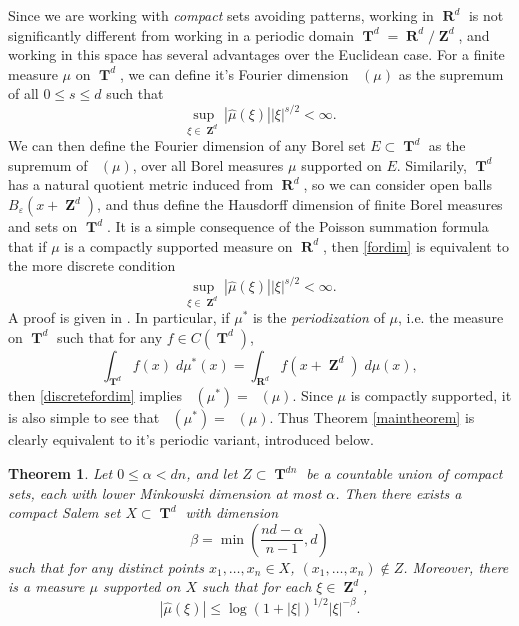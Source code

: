 \documentclass[12pt,reqno]{article}
\numberwithin{equation}{section}
\DeclareMathOperator{\hausdim}{\dim_{\mathbf{H}}}
\DeclareMathOperator{\fordim}{\dim_{\mathbf{F}}}
\DeclareMathOperator{\RR}{\mathbf{R}}
\DeclareMathOperator{\ZZ}{\mathbf{Z}}
\DeclareMathOperator{\TT}{\mathbf{T}}
\newtheorem{theorem}{Theorem}
\begin{document}
Since we are working with \emph{compact} sets avoiding patterns, working in $\RR^d$ is not significantly different from working in a periodic domain $\TT^d = \RR^d / \ZZ^d$, and working in this space has several advantages over the Euclidean case. For a finite measure $\mu$ on $\TT^d$, we can define it's Fourier dimension $\fordim(\mu)$ as the supremum of all $0 \leq s \leq d$ such that
%
\begin{equation} \label{fordimtorus}
    \sup_{\xi \in \ZZ^d} |\widehat{\mu}(\xi)| |\xi|^{s/2} < \infty.
\end{equation}
%
We can then define the Fourier dimension of any Borel set $E \subset \TT^d$ as the supremum of $\fordim(\mu)$, over all Borel measures $\mu$ supported on $E$. Similarily, $\TT^d$ has a natural quotient metric induced from $\RR^d$, so we can consider open balls $B_\varepsilon(x + \ZZ^d)$, and thus define the Hausdorff dimension of finite Borel measures and sets on $\TT^d$. It is a simple consequence of the Poisson summation formula that if $\mu$ is a compactly supported measure on $\RR^d$, then \eqref{fordim} is equivalent to the more discrete condition
%
\begin{equation} \label{discretefordim}
    \sup_{\xi \in \ZZ^d} |\widehat{\mu}(\xi)| |\xi|^{s/2} < \infty.
\end{equation}
%
A proof is given in \cite[Lemma 39]{myThesis}. In particular, if $\mu^*$ is the \emph{periodization} of $\mu$, i.e. the measure on $\TT^d$ such that for any $f \in C(\TT^d)$,
%
\[ \int_{\TT^d} f(x)\; d\mu^*(x) = \int_{\RR^d} f(x + \ZZ^d)\; d\mu(x), \]
%
then \eqref{discretefordim} implies $\fordim(\mu^*) = \fordim(\mu)$. Since $\mu$ is compactly supported, it is also simple to see that $\hausdim(\mu^*) = \hausdim(\mu)$. Thus Theorem \ref{maintheorem} is clearly equivalent to it's periodic variant, introduced below.

\begin{theorem} \label{periodictheorem}
    Let $0 \leq \alpha < dn$, and let $Z \subset \TT^{dn}$ be a countable union of compact sets, each with lower Minkowski dimension at most $\alpha$. Then there exists a compact Salem set $X \subset \TT^d$ with dimension
    \[ \beta = \min \left( \frac{nd - \alpha}{n-1}, d \right) \]
    such that for any distinct points $x_1, \dots, x_n \in X$, $(x_1, \dots, x_n) \not \in Z$. Moreover, there is a measure $\mu$ supported on $X$ such that for each $\xi \in \ZZ^d$,
    \[ |\widehat{\mu}(\xi)| \leq \log(1 + |\xi|)^{1/2} |\xi|^{-\beta}. \]
\end{theorem}
\end{document}
